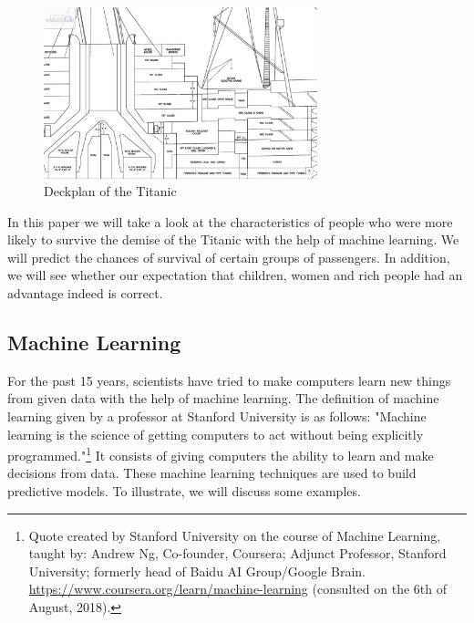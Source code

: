 \documentclass[11pt]{article}
\begin{document}
\begin{figure}[htbp]
\centering
\includegraphics[width=300px]{./Deck3.png}
\caption{\label{tab:titanicdeckplantwo}
Deckplan of the Titanic}
\end{figure} 


In this paper we will take a look at the characteristics of people who were more likely to survive the demise of the Titanic with the help of machine learning. We will predict the chances of survival of certain groups of passengers. In addition, we will see whether our expectation that children, women and rich people had an advantage indeed is correct. 

\subsection{Machine Learning}
\label{sec:org8cce5da}
For the past 15 years, scientists have tried to make computers learn new things from given data with the help of machine learning. The definition of machine learning given by a professor at Stanford University is as follows: "Machine learning is the science of getting computers to act without being explicitly programmed."\footnote{Quote created by Stanford University on the course of Machine Learning, taught by: Andrew Ng, Co-founder, Coursera; Adjunct Professor, Stanford University; formerly head of Baidu AI Group/Google Brain. \url{https://www.coursera.org/learn/machine-learning} (consulted on the 6th of August, 2018).} It consists of giving computers the ability to learn and make decisions from data. These machine learning techniques are used to build predictive models. To illustrate, we will discuss some examples. 
\end{document}
